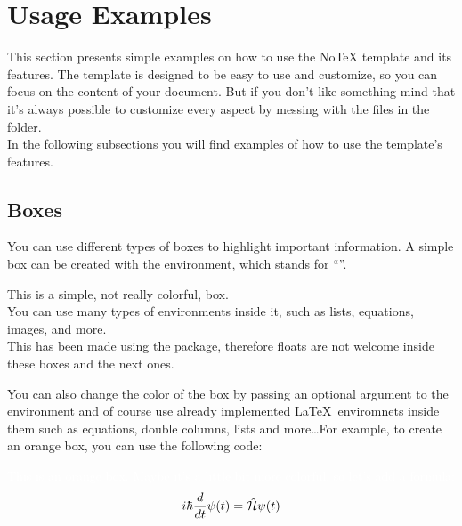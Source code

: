 \documentclass[../main.tex]{subfiles}
\begin{document}
\section{Usage Examples}

This section presents simple examples on how to use the NoTeX template and its
features. The template is designed to be easy to use and customize, so you can
focus on the content of your document. But if you don't like something mind that
it's always possible to customize every aspect by messing with the files in the
 folder.\\
In the following subsections you will find examples of how to use the template's
features.\\

\subsection{Boxes}

You can use different types of boxes to highlight important information. A
simple box can be created with the  environment, which stands for
``''.\\

\begin{cbox}
	This is a simple, not really colorful, box.\\
	You can use many types of environments inside it, such as lists, equations,
	images, and more.\\
	This has been made using the  package, therefore floats are not welcome inside these boxes and the next ones.
\end{cbox}

You can also change the color of the box by passing an optional argument to the
 environment and of course use already implemented \LaTeX\ enviromnets
inside them such as equations, double columns, lists and more\dots For example, to create an orange box, you can use the following code:

\begin{center}
\end{center}

\begin{cbox}[orange]
	\textcolor{background}{
		This is an orange box.
		Maybe it's a little bit more colorful, so let's add a formula:
		\begin{equation*}
			i \hbar \frac{d}{dt} \psi(t) = \mathcal{\hat{H}} \psi(t)
		\end{equation*}
}
\end{cbox}
\end{document}
